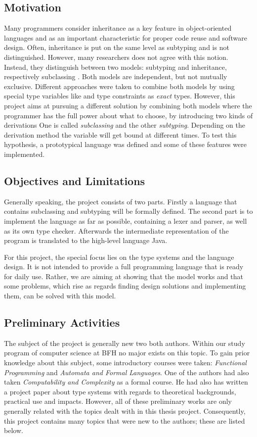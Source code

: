 \subsection{Motivation}
Many programmers consider inheritance as a key feature in object-oriented
languages and as an important characteristic for proper code reuse and
software design. Often, inheritance is put on the same level as subtyping
and is not distinguished. However, many researchers does not agree with
this notion. Instead, they distinguish between two models: subtyping and
inheritance, respectively subclassing \cite{taivalsaari_notion_1996}.
Both models are independent, but not mutually exclusive. Different approaches were
taken to combine both models by using special type variables like \mytype
and type constraints as \emph{exact} types. However, this project aims at
pursuing a different solution by combining both models where the programmer has
the full power about what to choose, by introducing two kinds of derivations
One is called \emph{subclassing} and the other \emph{subtyping}. Depending
on the derivation method the \mytype variable will get bound at different
times. To test this hypothesis, a prototypical language was defined and some
of these features were implemented.

\subsection{Objectives and Limitations}
Generally speaking, the project consists of two parts. Firstly a language
that contains subclassing and subtyping will be formally defined. The
second part is to implement the language as far as possible, containing
a lexer and parser, as well as its own type checker. Afterwards the
intermediate representation of the program is translated to the high-level
language Java.

For this project, the special focus lies on the type systems and the language
design. It is not intended to provide a full programming language that is
ready for daily use. Rather, we are aiming at showing that the model works and that some
problems, which rise as regards finding design solutions and implementing them, can be solved
with this model.

\subsection{Preliminary Activities}
The subject of the project is generally new two both authors. Within
our study program of computer science at BFH no major exists on this topic. To gain prior
knowledge about this subject, some introductory courses were taken:
\emph{Functional Programming} and \emph{Automata and Formal Languages}.
One of the authors had also taken \emph{Computability and Complexity} as
a formal course. He had also has written a project paper about type systems
with regards to theoretical backgrounds, practical use and impacts. However, all
of these preliminary works are only generally related with the topics dealt with in
this thesis project. Consequently, this project contains many topics that
were new to the authors; these are listed below.

